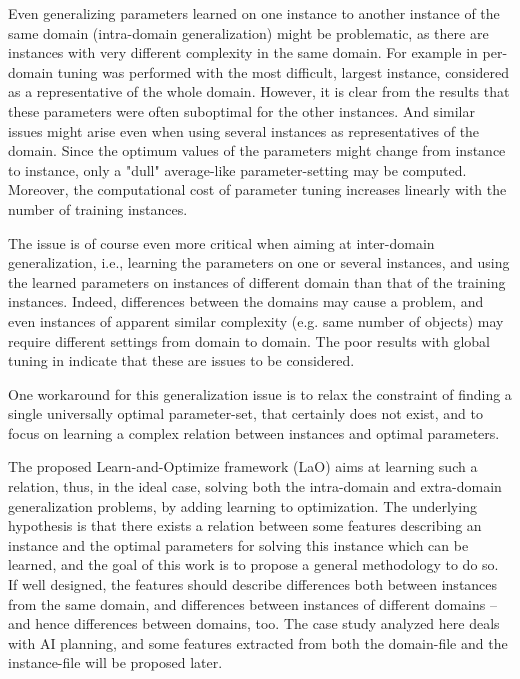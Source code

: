 \documentclass{MYsig-alternate}
\begin{document}
Even generalizing parameters learned on one instance to another instance of the same domain (intra-domain generalization) might be problematic, as there are instances with very different complexity in the same domain. For example in \cite{BibGECCO:2010} per-domain tuning was performed with the most difficult, largest instance, considered as a representative of the whole domain. However, it is clear from the results that these parameters were often suboptimal for the other instances. And similar issues might arise even when using several instances as representatives of the domain. Since the optimum values of the parameters might change from instance to instance, only a "dull" average-like parameter-setting may be computed. Moreover, the computational cost of parameter tuning increases linearly with the number of training instances. 

The issue is of course even more critical when aiming at inter-domain generalization, i.e., learning the parameters on one or several instances, and using the learned parameters on instances of different domain than that of the training instances. Indeed, differences between the domains may cause a problem, and even instances of apparent similar complexity (e.g. same number of objects) may require different settings from domain to domain. The poor results with global tuning in \cite{BibGECCO:2010} indicate that these are issues to be considered.

One workaround for this generalization issue is to relax the constraint of finding a single universally optimal parameter-set, that certainly does not exist, and to focus on learning a complex relation between instances and optimal parameters. 

The proposed Learn-and-Optimize framework (LaO) aims at learning such a relation, thus, in the ideal case, solving both the intra-domain and extra-domain generalization problems, by adding learning to optimization. The underlying hypothesis is that there exists a relation between some features describing an instance and the optimal parameters for solving this instance which can be learned, and the goal of this work is to propose a general methodology to do so. If well designed, the features should describe differences both between instances from the same domain, and differences between instances of different domains -- and hence differences between domains, too. 
The case study analyzed here deals with AI planning, and some features extracted from both the domain-file and the instance-file will be proposed later.
\end{document}
